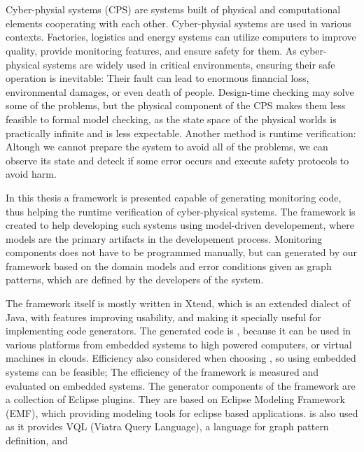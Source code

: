 \chapter{\bevezetes}

Cyber-physial systems (CPS) are systems built of physical and computational elements cooperating with each other.
Cyber-physial systems are used in various contexts. 
Factories, logistics and energy systems can utilize computers to improve quality, provide monitoring features, and ensure safety for them.
As cyber-physical systems are widely used in critical environments, ensuring their safe operation is inevitable: Their fault can lead to enormous financial loss, environmental damages, or even death of people.
Design-time checking may solve some of the problems, but the physical component of the CPS makes them less feasible to formal model checking, as the state space of the physical worlds is practically infinite and is less expectable.
Another method is runtime verification: Altough we cannot prepare the system to avoid all of the problems, we can observe its state and deteck if some error occurs and execute safety protocols to avoid harm. 


In this thesis a framework is presented capable of generating monitoring code, thus helping the runtime verification of cyber-physical systems. 
The framework is created to help developing such systems using model-driven developement, where models are the primary artifacts in the developement process.
Monitoring components does not have to be programmed manually, but can generated by our framework based on the domain models and error conditions given as graph patterns, which are defined by the developers of the system.

The framework itself is mostly written in Xtend, which is an extended dialect of Java, with features improving usability, and making it specially useful for implementing code generators. 
The generated code is \cpp{}, because it can be used in various platforms from embedded systems to high powered computers, or virtual machines in clouds. 
Efficiency also considered when choosing \cpp{}, so using embedded systems can be feasible; 
The efficiency of the framework is measured and evaluated on embedded systems. 
The generator components of the framework are a collection of Eclipse plugins.
They are based on Eclipse Modeling Framework (EMF), which providing modeling tools for eclipse based applications.
\viatra is also used as it provides VQL (Viatra Query Language), a language for graph pattern definition, and 

